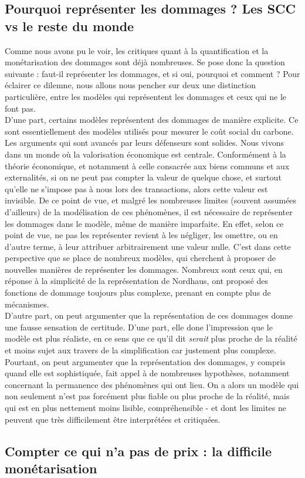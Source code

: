 \subsection{Pourquoi représenter les dommages ? Les SCC vs le reste du monde}

Comme nous avons pu le voir, les critiques quant à la quantification et la monétarisation des dommages sont déjà nombreuses. Se pose donc la question suivante : faut-il représenter les dommages, et si oui, pourquoi et comment ? Pour éclairer ce dilemne, nous allons nous pencher sur deux une distinction particulière, entre les modèles qui représentent les dommages et ceux qui ne le font pas. \\

D'une part, certains modèles représentent des dommages de manière explicite. Ce sont essentiellement des modèles utilisés pour mesurer le coût social du carbone. Les arguments qui sont avancés par leurs défenseurs sont solides. Nous vivons dans un monde où la valorisation économique est centrale. Conformément à la théorie économique, et notamment à celle consacrée aux biens communs et aux externalités, si on ne peut pas compter la valeur de quelque chose, et surtout qu'elle ne s'impose pas à nous lors des transactions, alors cette valeur est invisible. De ce point de vue, et malgré les nombreuses limites (souvent assumées d'ailleurs) de la modélisation de ces phénomènes, il est nécessaire de représenter les dommages dans le modèle, même de manière imparfaite. En effet, selon ce point de vue, ne pas les représenter revient à les négliger, les omettre, ou en d'autre terme, à leur attribuer arbitrairement une valeur nulle. 
C'est dans cette perspective que se place de nombreux modèles, qui cherchent à proposer de nouvelles manières de représenter les dommages. Nombreux sont ceux qui, en réponse à la simplicité de la représentation de Nordhaus, ont proposé des fonctions de dommage toujours plus complexe, prenant en compte plus de mécanismes. 
\\

D'autre part, on peut argumenter que la représentation de ces dommages donne une fausse sensation de certitude. D'une part, elle done l'impression que le modèle est plus réaliste, en ce sens que ce qu'il dit \textit{serait} plus proche de la réalité et moins sujet aux travers de la simplification car justement plus complexe. Pourtant, on peut argumenter que la représentation des dommages, y compris quand elle est sophistiquée, fait appel à de nombreuses hypothèses, notamment concernant la permanence des phénomènes qui ont lieu. On a alors un modèle qui non seulement n'est pas forcément plus fiable ou plus proche de la réalité, mais qui est en plus nettement moins lisible, compréhensible - et dont les limites ne peuvent que très difficilement être interprétées et critiquées. 

\subsection{Compter ce qui n'a pas de prix : la difficile monétarisation}

